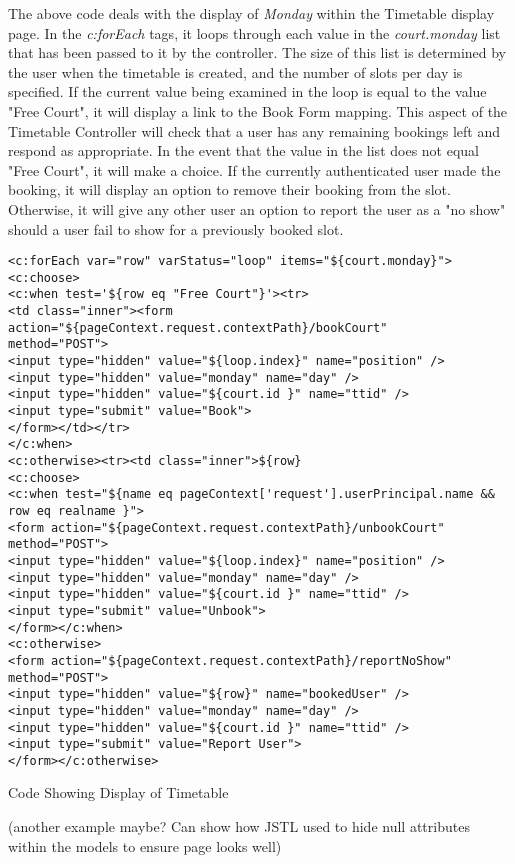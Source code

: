 The above code deals with the display of \textit{Monday} within the Timetable display page. In the \textit{c:forEach} tags, it loops through each value in the \textit{court.monday} list that has been passed to it by the controller. The size of this list is determined by the user when the timetable is created, and the number of slots per day is specified. If the current value being examined in the loop is equal to the value "Free Court", it will display a link to the Book Form mapping. This aspect of the Timetable Controller will check that a user has any remaining bookings left and respond as appropriate. In the event that the value in the list does not equal "Free Court", it will make a choice. If the currently authenticated user made the booking, it will display an option to remove their booking from the slot. Otherwise, it will give any other user an option to report the user as a "no show" should a user fail to show for a previously booked slot. \newline

\begin{table}[H]
\begin{lstlisting}
<c:forEach var="row" varStatus="loop" items="${court.monday}">
<c:choose>
<c:when test='${row eq "Free Court"}'><tr>
<td class="inner"><form action="${pageContext.request.contextPath}/bookCourt"
method="POST">
<input type="hidden" value="${loop.index}" name="position" />
<input type="hidden" value="monday" name="day" /> 
<input type="hidden" value="${court.id }" name="ttid" />
<input type="submit" value="Book">
</form></td></tr>
</c:when>
<c:otherwise><tr><td class="inner">${row}
<c:choose>
<c:when test="${name eq pageContext['request'].userPrincipal.name && row eq realname }">
<form action="${pageContext.request.contextPath}/unbookCourt" method="POST">
<input type="hidden" value="${loop.index}" name="position" />
<input type="hidden" value="monday" name="day" /> 
<input type="hidden" value="${court.id }" name="ttid" /> 
<input type="submit" value="Unbook">
</form></c:when>
<c:otherwise>
<form action="${pageContext.request.contextPath}/reportNoShow" method="POST">
<input type="hidden" value="${row}" name="bookedUser" />
<input type="hidden" value="monday" name="day" /> 
<input type="hidden" value="${court.id }" name="ttid" /> 
<input type="submit" value="Report User">
</form></c:otherwise>
\end{lstlisting}
\caption{Code Showing Display of Timetable}
\end{table}

(another example maybe? Can show how JSTL used to hide null attributes within the models to ensure page looks well)
 

